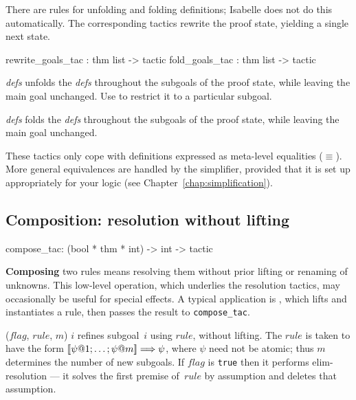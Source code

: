 There are rules for unfolding and folding definitions; Isabelle does not do
this automatically.  The corresponding tactics rewrite the proof state,
yielding a single next state.
\begin{ttbox} 
rewrite_goals_tac : thm list -> tactic
fold_goals_tac    : thm list -> tactic
\end{ttbox}
\begin{ttdescription}
\item[\ttindexbold{rewrite_goals_tac} {\it defs}]  
unfolds the {\it defs} throughout the subgoals of the proof state, while
leaving the main goal unchanged.  Use  to restrict it to a
particular subgoal.

\item[\ttindexbold{fold_goals_tac} {\it defs}]  
folds the {\it defs} throughout the subgoals of the proof state, while
leaving the main goal unchanged.
\end{ttdescription}

\begin{warn}
  These tactics only cope with definitions expressed as meta-level
  equalities ($\equiv$).  More general equivalences are handled by the
  simplifier, provided that it is set up appropriately for your logic
  (see Chapter~\ref{chap:simplification}).
\end{warn}


\subsection{Composition: resolution without lifting}
\begin{ttbox}
compose_tac: (bool * thm * int) -> int -> tactic
\end{ttbox}
{\bf Composing} two rules means resolving them without prior lifting or
renaming of unknowns.  This low-level operation, which underlies the
resolution tactics, may occasionally be useful for special effects.
A typical application is , which lifts and instantiates a
rule, then passes the result to {\tt compose_tac}.
\begin{ttdescription}
\item[\ttindexbold{compose_tac} ($flag$, $rule$, $m$) $i$] 
refines subgoal~$i$ using $rule$, without lifting.  The $rule$ is taken to
have the form $\List{\psi@1; \ldots; \psi@m} \Imp \psi$, where $\psi$ need
not be atomic; thus $m$ determines the number of new subgoals.  If
$flag$ is {\tt true} then it performs elim-resolution --- it solves the
first premise of~$rule$ by assumption and deletes that assumption.
\end{ttdescription}



